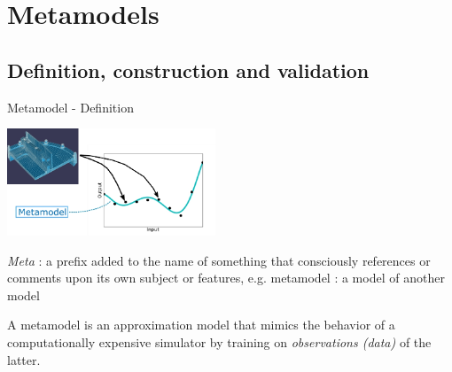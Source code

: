\documentclass[9pt]{beamer}
\begin{document}
\section{Metamodels}

\subsection{Definition, construction and validation}

\begin{frame}[t]{Metamodel - Definition}

\begin{center}
 \includegraphics[height=3.2cm]{../Pics/resp_surf_sketch.jpg}
\end{center}


\emph{Meta} : a prefix added to the name of something that consciously references or comments upon its own subject or features, e.g. metamodel : a model of another model

\vspace{0.2cm}
A metamodel is an approximation model that mimics the behavior of a computationally expensive simulator by training on \emph{observations (data)} of the latter.

 

\end{frame}
\end{document}
